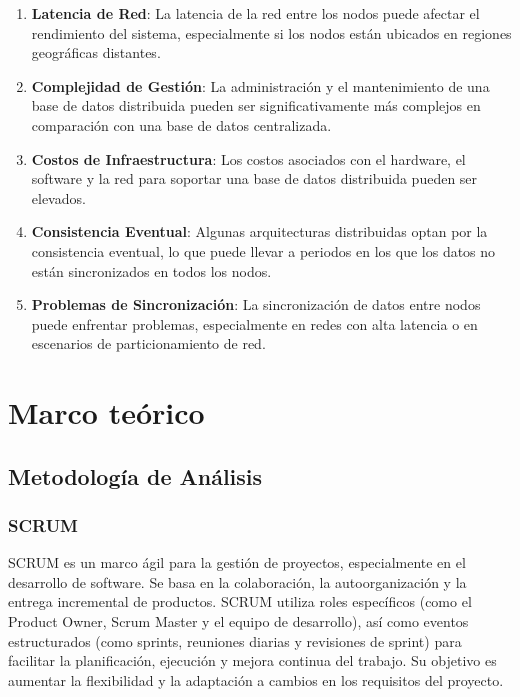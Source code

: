\documentclass[spanish, 12pt]{article}
\providecommand{\tightlist}{\setlength{\itemsep}{0pt}
\setlength{\parskip}{0pt}}
\begin{document}
	\begin{enumerate}
		\def\labelenumi{\arabic{enumi}.} \tightlist

		\item \textbf{Latencia de Red}: La latencia de la red entre los nodos puede afectar
			el rendimiento del sistema, especialmente si los nodos están ubicados en
			regiones geográficas distantes.

		\item \textbf{Complejidad de Gestión}: La administración y el mantenimiento de
			una base de datos distribuida pueden ser significativamente más complejos en
			comparación con una base de datos centralizada.

		\item \textbf{Costos de Infraestructura}: Los costos asociados con el hardware,
			el software y la red para soportar una base de datos distribuida pueden
			ser elevados.

		\item \textbf{Consistencia Eventual}: Algunas arquitecturas distribuidas optan
			por la consistencia eventual, lo que puede llevar a periodos en los que
			los datos no están sincronizados en todos los nodos.

		\item \textbf{Problemas de Sincronización}: La sincronización de datos entre
			nodos puede enfrentar problemas, especialmente en redes con alta latencia
			o en escenarios de particionamiento de red.
	\end{enumerate}

	\section{Marco teórico}
	\label{marco-teuxf3rico}

	\subsection{Metodología de Análisis}
	\label{metodologuxeda-de-anuxe1lisis}

	\subsubsection{SCRUM}
	\label{scrum}

	SCRUM es un marco ágil para la gestión de proyectos, especialmente en el
	desarrollo de software. Se basa en la colaboración, la autoorganización y la
	entrega incremental de productos. SCRUM utiliza roles específicos (como el
	Product Owner, Scrum Master y el equipo de desarrollo), así como eventos estructurados
	(como sprints, reuniones diarias y revisiones de sprint) para facilitar la
	planificación, ejecución y mejora continua del trabajo. Su objetivo es
	aumentar la flexibilidad y la adaptación a cambios en los requisitos del
	proyecto.
\end{document}
